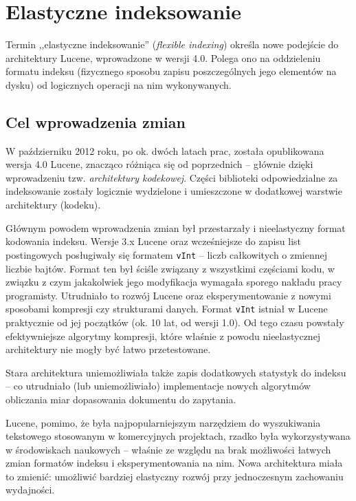 \chapter{Elastyczne indeksowanie}

Termin ,,elastyczne indeksowanie'' (\emph{flexible indexing}) określa nowe podejście do architektury Lucene, wprowadzone w wersji 4.0. Polega ono na oddzieleniu formatu indeksu (fizycznego sposobu zapisu poszczególnych jego elementów na dysku) od logicznych operacji na nim wykonywanych.

\section{Cel wprowadzenia zmian}

W październiku 2012 roku, po ok. dwóch latach prac, została opublikowana wersja 4.0 Lucene, znacząco różniąca się od poprzednich -- głównie dzięki wprowadzeniu tzw. \emph{architektury kodekowej}. Części biblioteki odpowiedzialne za indeksowanie zostały logicznie wydzielone i umieszczone w dodatkowej warstwie architektury (kodeku). 

Głównym powodem wprowadzenia zmian był przestarzały i nieelastyczny format kodowania indeksu. Wersje 3.x Lucene oraz wcześniejsze do zapisu list postingowych posługiwały się formatem \texttt{vInt} -- liczb całkowitych o zmiennej liczbie bajtów. Format ten był ściśle związany z wszystkimi częściami kodu, w związku z czym jakakolwiek jego modyfikacja wymagała sporego nakładu pracy programisty. Utrudniało to rozwój Lucene oraz eksperymentowanie z nowymi sposobami kompresji czy strukturami danych. Format \texttt{vInt} istniał w Lucene praktycznie od jej początków (ok. 10 lat, od wersji 1.0). Od tego czasu powstały efektywniejsze algorytmy kompresji, które właśnie z powodu nieelastycznej architektury nie mogły być łatwo przetestowane.

Stara architektura uniemożliwiała także zapis dodatkowych statystyk do indeksu -- co utrudniało (lub uniemożliwiało) implementacje nowych algorytmów obliczania miar dopasowania dokumentu do zapytania.

Lucene, pomimo, że była najpopularniejszym narzędziem do wyszukiwania tekstowego stosowanym w komercyjnych projektach, rzadko była wykorzystywana w środowiskach naukowych -- właśnie ze względu na brak możliwości łatwych zmian formatów indeksu i eksperymentowania na nim. Nowa architektura miała to zmienić: umożliwić bardziej elastyczny rozwój przy jednoczesnym zachowaniu wydajności.

